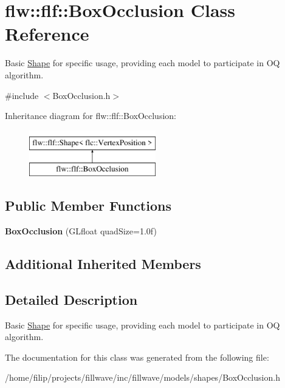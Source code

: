 \hypertarget{classflw_1_1flf_1_1BoxOcclusion}{}\section{flw\+:\+:flf\+:\+:Box\+Occlusion Class Reference}
\label{classflw_1_1flf_1_1BoxOcclusion}


Basic \hyperlink{classflw_1_1flf_1_1Shape}{Shape} for specific usage, providing each model to participate in OQ algorithm.  




{\ttfamily \#include $<$Box\+Occlusion.\+h$>$}

Inheritance diagram for flw\+:\+:flf\+:\+:Box\+Occlusion\+:\begin{figure}[H]
\begin{center}
\leavevmode
\includegraphics[height=2.000000cm]{classflw_1_1flf_1_1BoxOcclusion}
\end{center}
\end{figure}
\subsection*{Public Member Functions}
\begin{DoxyCompactItemize}
\item 
\mbox{\label{classflw_1_1flf_1_1BoxOcclusion_a8c6897ee2fc8384490f2a78714004ff9}} 
{\bfseries Box\+Occlusion} (G\+Lfloat quad\+Size=1.\+0f)
\end{DoxyCompactItemize}
\subsection*{Additional Inherited Members}


\subsection{Detailed Description}
Basic \hyperlink{classflw_1_1flf_1_1Shape}{Shape} for specific usage, providing each model to participate in OQ algorithm. 

The documentation for this class was generated from the following file\+:\begin{DoxyCompactItemize}
\item 
/home/filip/projects/fillwave/inc/fillwave/models/shapes/Box\+Occlusion.\+h\end{DoxyCompactItemize}
